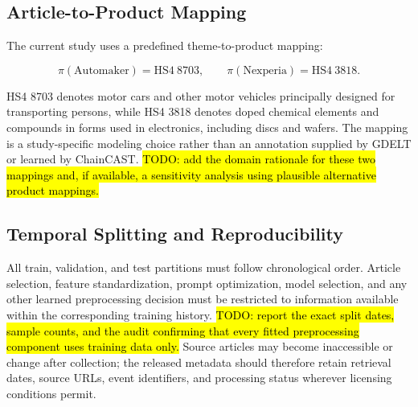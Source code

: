 \documentclass[letterpaper]{article} %
\begin{document}
\subsection{Article-to-Product Mapping}

The current study uses a predefined theme-to-product mapping:

\begin{equation}
\pi(\mathrm{Automaker}) = \mathrm{HS4}\ 8703,
\qquad
\pi(\mathrm{Nexperia}) = \mathrm{HS4}\ 3818.
\end{equation}

HS4 8703 denotes motor cars and other motor vehicles principally designed for transporting persons, while HS4 3818 denotes doped chemical elements and compounds in forms used in electronics, including discs and wafers. The mapping is a study-specific modeling choice rather than an annotation supplied by GDELT or learned by ChainCAST. \hl{TODO: add the domain rationale for these two mappings and, if available, a sensitivity analysis using plausible alternative product mappings.}

\subsection{Temporal Splitting and Reproducibility}

All train, validation, and test partitions must follow chronological order. Article selection, feature standardization, prompt optimization, model selection, and any other learned preprocessing decision must be restricted to information available within the corresponding training history. \hl{TODO: report the exact split dates, sample counts, and the audit confirming that every fitted preprocessing component uses training data only.} Source articles may become inaccessible or change after collection; the released metadata should therefore retain retrieval dates, source URLs, event identifiers, and processing status wherever licensing conditions permit.



% 
\end{document}
